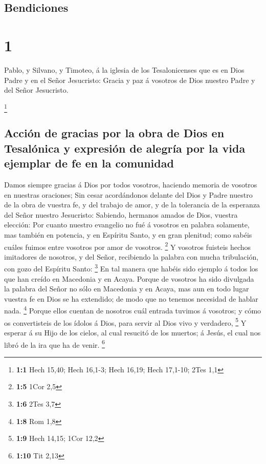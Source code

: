 \hypertarget{bendiciones}{%
\subsection{Bendiciones}\label{bendiciones}}

\hypertarget{section}{%
\section{1}\label{section}}

 Pablo, y Silvano, y Timoteo, á la iglesia de los
Tesalonicenses que es en Dios Padre y en el Señor Jesucristo: Gracia y
paz á vosotros de Dios nuestro Padre y del Señor Jesucristo.

\footnote{\textbf{1:1} Hech 15,40; Hech 16,1-3; Hech 16,19; Hech
  17,1-10; 2Tes 1,1}

\hypertarget{acciuxf3n-de-gracias-por-la-obra-de-dios-en-tesaluxf3nica-y-expresiuxf3n-de-alegruxeda-por-la-vida-ejemplar-de-fe-en-la-comunidad}{%
\subsection{Acción de gracias por la obra de Dios en Tesalónica y
expresión de alegría por la vida ejemplar de fe en la
comunidad}\label{acciuxf3n-de-gracias-por-la-obra-de-dios-en-tesaluxf3nica-y-expresiuxf3n-de-alegruxeda-por-la-vida-ejemplar-de-fe-en-la-comunidad}}

 Damos siempre gracias á Dios por todos vosotros, haciendo
memoria de vosotros en nuestras oraciones;  Sin cesar
acordándonos delante del Dios y Padre nuestro de la obra de vuestra fe,
y del trabajo de amor, y de la tolerancia de la esperanza del Señor
nuestro Jesucristo:  Sabiendo, hermanos amados de Dios,
vuestra elección:  Por cuanto nuestro evangelio no fué á
vosotros en palabra solamente, mas también en potencia, y en Espíritu
Santo, y en gran plenitud; como sabéis cuáles fuimos entre vosotros por
amor de vosotros. \footnote{\textbf{1:5} 1Cor 2,5}  Y
vosotros fuisteis hechos imitadores de nosotros, y del Señor, recibiendo
la palabra con mucha tribulación, con gozo del Espíritu Santo:
\footnote{\textbf{1:6} 2Tes 3,7}  En tal manera que habéis
sido ejemplo á todos los que han creído en Macedonia y en Acaya.
 Porque de vosotros ha sido divulgada la palabra del Señor
no sólo en Macedonia y en Acaya, mas aun en todo lugar vuestra fe en
Dios se ha extendido; de modo que no tenemos necesidad de hablar nada.
\footnote{\textbf{1:8} Rom 1,8}  Porque ellos cuentan de
nosotros cuál entrada tuvimos á vosotros; y cómo os convertisteis de los
ídolos á Dios, para servir al Dios vivo y verdadero, \footnote{\textbf{1:9}
  Hech 14,15; 1Cor 12,2}  Y esperar á su Hijo de los
cielos, al cual resucitó de los muertos; á Jesús, el cual nos libró de
la ira que ha de venir. \footnote{\textbf{1:10} Tit 2,13}


